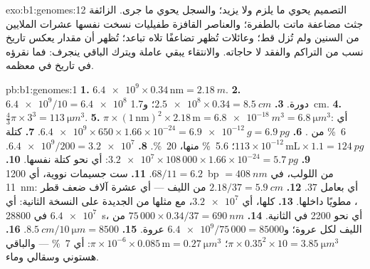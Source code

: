 \begin{solution}{exo:b1:genomes:12}
التصميم يحوي ما يلزم ولا يزيد؛ والسجل يحوي ما جرى.  الزائفة
جثث  مضاعفة ماتت بالطفرة؛ والعناصر القافزة طفيليات نسخت نفسها
عشرات الملايين من السنين ولم تُزل قط؛ وعائلات  تُظهر تضاعفًا
تلاه تباعد؛  تُظهر أن مقدار  يعكس تاريخ نسب من
التراكم والفقد لا حاجاته. والانتقاء يبقي  عاملة ويترك الباقي
ينجرف: فما نقرؤه في  تاريخ في معظمه.
\end{solution}

\begin{solution}{pb:b1:genomes:1}
\textbf{1.} $\num{6.4e9}\times 0.34\,\mathrm{nm} = \qty{2.18}{m}$.
\textbf{2.} $\num{6.4e9}/10 = \num{6.4e8}$ دورة.
\textbf{3.} $\num{2.5e8}\times 0.34 = \qty{8.5}{cm}$؛ و\qty{1.7}{cm}.
\textbf{4.} $\frac{4}{3}\pi\times 3^3 = \qty{113}{\micro m^3}$.
\textbf{5.} $\pi\times(1\,\mathrm{nm})^2\times 2.18\,\mathrm{m} =
\qty{6.8e-18}{m^3} = \qty{6.8}{\micro m^3}$: أي \qty{6}{\%} من .
\textbf{6.} $\num{6.4e9}\times 650\times 1.66\times 10^{-24} =
\qty{6.9e-12}{g} = \qty{6.9}{pg}$.
\textbf{7.} كتلة  $113\times 10^{-12}\,\mathrm{mL}\times 1.1 =
\qty{124}{pg}$؛  \qty{5.6}{\%} منها،  \qty{20}{\%}.
\textbf{8.} $\num{6.4e9}/200 = \num{3.2e7}$.
\textbf{9.} $\num{3.2e7}\times 108\,000\times 1.66\times 10^{-24} =
\qty{5.7}{pg}$: أي نحو كتلة  نفسها.
\textbf{10.} $68/11 = 6.2$.
\textbf{11.} ست جسيمات نووية، أي \qty{1200}{bp} $= \qty{408}{nm}$ من
اللولب، في \qty{11}{nm}: أي بعامل $37$.
\textbf{12.} $2.18/37 = \qty{5.9}{cm}$ من الليف --- أي عشرة آلاف ضعف
قطر ، مطويًا داخلها.
\textbf{13.} كلها، أي $\num{3.2e7}$، مع مثلها من الجديدة على النسخة
الثانية: أي $\num{6.4e7}$ في \qty{28800}{s}، أي نحو \num{2200} في
الثانية.
\textbf{14.} $75\,000\times 0.34/37 = \qty{690}{nm}$ من الليف لكل
عروة؛ و$\num{6.4e9}/75\,000 = \num{85000}$ عروة.
\textbf{15.} $\qty{8.5}{cm}/\qty{10}{\micro m} = 8500$.
\textbf{16.} $\pi\times 0.35^2\times 10 = \qty{3.85}{\micro m^3}$؛
 $\pi\times 10^{-6}\times 0.085\,\mathrm{m} = \qty{0.27}{\micro m^3}$:
أي \qty{7}{\%} --- والباقي  هستوني وسقالي وماء.

\end{solution}
